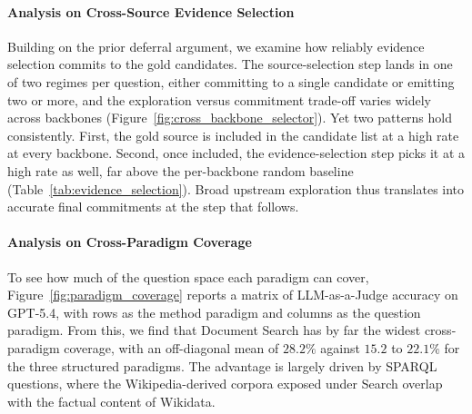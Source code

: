 \documentclass{llmxive}
\begin{document}
\paragraph{Analysis on Cross-Source Evidence Selection}
Building on the prior deferral argument, we examine how reliably evidence selection commits to the gold candidates. The source-selection step lands in one of two regimes per question, either committing to a single candidate or emitting two or more, and the exploration versus commitment trade-off varies widely across backbones (Figure~\ref{fig:cross_backbone_selector}). Yet two patterns hold consistently. First, the gold source is included in the candidate list at a high rate at every backbone. Second, once included, the evidence-selection step picks it at a high rate as well, far above the per-backbone random baseline (Table~\ref{tab:evidence_selection}). Broad upstream exploration thus translates into accurate final commitments at the step that follows.

\paragraph{Analysis on Cross-Paradigm Coverage}
To see how much of the question space each paradigm can cover, Figure~\ref{fig:paradigm_coverage} reports a matrix of LLM-as-a-Judge accuracy on GPT-5.4, with rows as the method paradigm and columns as the question paradigm. From this, we find that Document Search has by far the widest cross-paradigm coverage, with an off-diagonal mean of $28.2\%$ against $15.2$ to $22.1\%$ for the three structured paradigms. The advantage is largely driven by SPARQL questions, where the Wikipedia-derived corpora exposed under Search overlap with the factual content of Wikidata.

\end{document}
